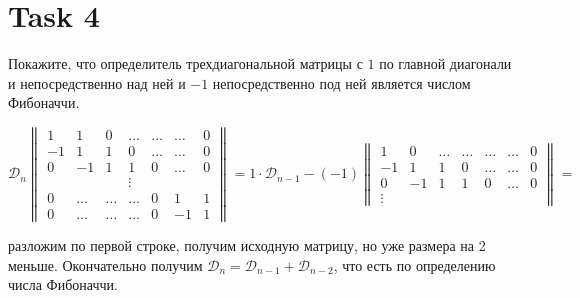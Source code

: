 \section{Task 4}
\begin{task}
    Покажите, что определитель трехдиагональной матрицы с $1$ по главной диагонали и непосредственно над ней и $-1$ непосредственно под ней является числом Фибоначчи.
\end{task}

\begin{solution}
    \begin{equation}
        \mathcal{D}_n
        \begin{Vmatrix}
             1 &  1 & 0 & \ldots & \ldots & \ldots & 0 \\
            -1 &  1 & 1 & 0 & \ldots & \ldots & 0 \\
             0 & -1 & 1 & 1 & 0 & \ldots & 0 \\
             & & &\vdots \\
            0 & \ldots & \ldots & \ldots & 0 &  1 & 1 \\
            0 & \ldots & \ldots & \ldots & 0 & -1 & 1
        \end{Vmatrix} = 1\cdot\mathcal{D}_{n-1} - (-1)
        \begin{Vmatrix}
            1 &  0 & \ldots & \ldots & \ldots & \ldots & 0 \\
            -1 &  1 & 1      & 0      & \ldots & \ldots & 0 \\
            0 & -1 & 1      & 1      & 0      & \ldots & 0 \\
            \vdots
        \end{Vmatrix} =
    \end{equation}

    разложим по первой строке, получим исходную матрицу, но уже размера на 2 меньше. Окончательно получим $\mathcal{D}_n = \mathcal{D}_{n-1} + \mathcal{D}_{n-2}$, что есть по определению числа Фибоначчи.
    
\end{solution}